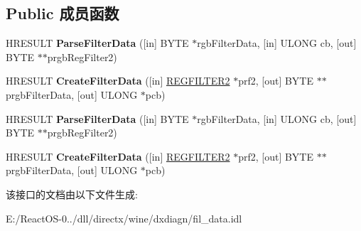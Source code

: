 \subsection*{Public 成员函数}
\begin{DoxyCompactItemize}
\item 
\mbox{\label{interface_i_a_m_filter_data_abeac5967ceebd8191ca84f33cee607de}} 
H\+R\+E\+S\+U\+LT {\bfseries Parse\+Filter\+Data} (\mbox{[}in\mbox{]} B\+Y\+TE $\ast$rgb\+Filter\+Data, \mbox{[}in\mbox{]} U\+L\+O\+NG cb, \mbox{[}out\mbox{]} B\+Y\+TE $\ast$$\ast$prgb\+Reg\+Filter2)
\item 
\mbox{\label{interface_i_a_m_filter_data_afc4bd32ae88044a6e648699da6175cef}} 
H\+R\+E\+S\+U\+LT {\bfseries Create\+Filter\+Data} (\mbox{[}in\mbox{]} \hyperlink{struct_r_e_g_f_i_l_t_e_r2}{R\+E\+G\+F\+I\+L\+T\+E\+R2} $\ast$prf2, \mbox{[}out\mbox{]} B\+Y\+TE $\ast$$\ast$prgb\+Filter\+Data, \mbox{[}out\mbox{]} U\+L\+O\+NG $\ast$pcb)
\item 
\mbox{\label{interface_i_a_m_filter_data_abeac5967ceebd8191ca84f33cee607de}} 
H\+R\+E\+S\+U\+LT {\bfseries Parse\+Filter\+Data} (\mbox{[}in\mbox{]} B\+Y\+TE $\ast$rgb\+Filter\+Data, \mbox{[}in\mbox{]} U\+L\+O\+NG cb, \mbox{[}out\mbox{]} B\+Y\+TE $\ast$$\ast$prgb\+Reg\+Filter2)
\item 
\mbox{\label{interface_i_a_m_filter_data_afc4bd32ae88044a6e648699da6175cef}} 
H\+R\+E\+S\+U\+LT {\bfseries Create\+Filter\+Data} (\mbox{[}in\mbox{]} \hyperlink{struct_r_e_g_f_i_l_t_e_r2}{R\+E\+G\+F\+I\+L\+T\+E\+R2} $\ast$prf2, \mbox{[}out\mbox{]} B\+Y\+TE $\ast$$\ast$prgb\+Filter\+Data, \mbox{[}out\mbox{]} U\+L\+O\+NG $\ast$pcb)
\end{DoxyCompactItemize}


该接口的文档由以下文件生成\+:\begin{DoxyCompactItemize}
\item 
E\+:/\+React\+O\+S-\/0../dll/directx/wine/dxdiagn/fil\+\_\+data.\+idl\end{DoxyCompactItemize}

